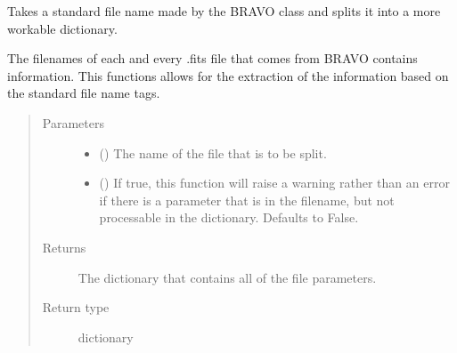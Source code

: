 \documentclass[letterpaper,10pt,english]{sphinxmanual}
\begin{document}
\begin{fulllineitems}
\label{\detokenize{python_docstrings/IfA_Smeargle.bravo.renaming:IfA_Smeargle.bravo.renaming.filename_split_by_parameter}}
Takes a standard file name made by the BRAVO class and splits it into
a more workable dictionary.

The filenames of each and every .fits file that comes from BRAVO contains
information. This functions allows for the extraction of the information
based on the standard file name tags.
\begin{quote}\begin{description}
\item[{Parameters}] \leavevmode\begin{itemize}
\item {} 
 () \textendash{} The name of the file that is to be split.

\item {} 
 (\sphinxstyleliteralemphasis{\sphinxupquote{ (}}\sphinxstyleliteralemphasis{\sphinxupquote{)}}) \textendash{} If true, this function will raise a warning rather than an error if
there is a parameter that is in the filename, but not processable in
the dictionary. Defaults to False.

\end{itemize}

\item[{Returns}] \leavevmode
{} \textendash{} The dictionary that contains all of the file parameters.

\item[{Return type}] \leavevmode
dictionary

\end{description}\end{quote}

\end{fulllineitems}

\end{document}
